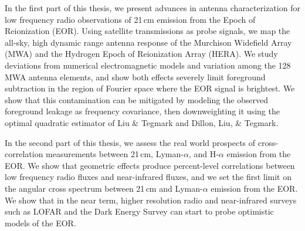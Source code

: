 In the first part of this thesis, we present advances in antenna characterization for low frequency radio observations of 21\,cm emission from the Epoch of Reionization (EOR). Using satellite transmissions as probe signals, we map the all-sky, high dynamic range antenna response of the Murchison Widefield Array (MWA) and the Hydrogen Epoch of Reionization Array (HERA). We study deviations from numerical electromagnetic models and variation among the 128 MWA antenna elements, and show both effects severely limit foreground subtraction in the region of Fourier space where the EOR signal is brightest. We show that this contamination can be mitigated by modeling the observed foreground leakage as frequency covariance, then downweighting it using the optimal quadratic estimator of Liu \& Tegmark and Dillon, Liu, \& Tegmark.

In the second part of this thesis, we assess the real world prospects of cross-correlation measurements between 21\,cm, Lyman-$\alpha$, and H-$\alpha$ emission from the EOR. We show that geometric effects produce percent-level correlations between low frequency radio fluxes and near-infrared fluxes, and we set the first limit on the angular cross spectrum between 21\,cm and Lyman-$\alpha$ emission from the EOR. We show that in the near term, higher resolution radio and near-infrared surveys such as LOFAR and the Dark Energy Survey can start to probe optimistic models of the EOR.

